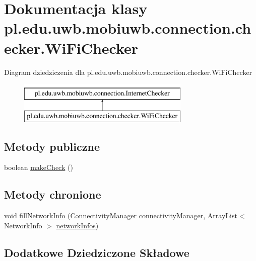 \hypertarget{classpl_1_1edu_1_1uwb_1_1mobiuwb_1_1connection_1_1checker_1_1_wi_fi_checker}{}\section{Dokumentacja klasy pl.\+edu.\+uwb.\+mobiuwb.\+connection.\+checker.\+Wi\+Fi\+Checker}
\label{classpl_1_1edu_1_1uwb_1_1mobiuwb_1_1connection_1_1checker_1_1_wi_fi_checker}
Diagram dziedziczenia dla pl.\+edu.\+uwb.\+mobiuwb.\+connection.\+checker.\+Wi\+Fi\+Checker\begin{figure}[H]
\begin{center}
\leavevmode
\includegraphics[height=2.000000cm]{classpl_1_1edu_1_1uwb_1_1mobiuwb_1_1connection_1_1checker_1_1_wi_fi_checker}
\end{center}
\end{figure}
\subsection*{Metody publiczne}
\begin{DoxyCompactItemize}
\item 
boolean \hyperlink{classpl_1_1edu_1_1uwb_1_1mobiuwb_1_1connection_1_1checker_1_1_wi_fi_checker_a571937780c67ba4cb7865117adc49f4b}{make\+Check} ()
\end{DoxyCompactItemize}
\subsection*{Metody chronione}
\begin{DoxyCompactItemize}
\item 
void \hyperlink{classpl_1_1edu_1_1uwb_1_1mobiuwb_1_1connection_1_1checker_1_1_wi_fi_checker_a36ab3501e4de69ba1b2de2483efdd950}{fill\+Network\+Info} (Connectivity\+Manager connectivity\+Manager, Array\+List$<$ Network\+Info $>$ \hyperlink{classpl_1_1edu_1_1uwb_1_1mobiuwb_1_1connection_1_1_internet_checker_a2edc06b95c5a74eee801d1dd2643b464}{network\+Infos})
\end{DoxyCompactItemize}
\subsection*{Dodatkowe Dziedziczone Składowe}


